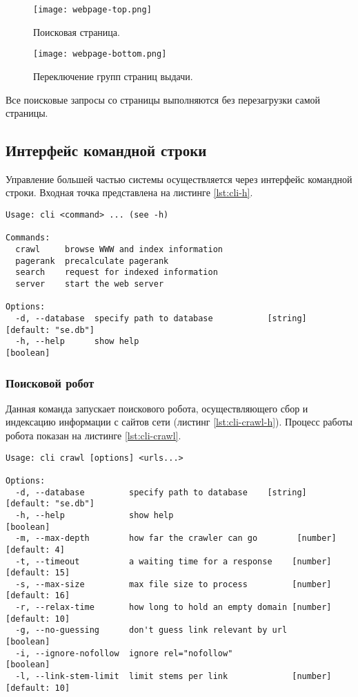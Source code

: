 \begin{figure}[h]
  \centering
  \texttt{[image: webpage-top.png]}
  \caption{Поисковая страница.}
  \label{fig:webpage-top}
\end{figure}

\begin{figure}[h]
  \centering
  \texttt{[image: webpage-bottom.png]}
  \caption{Переключение групп страниц выдачи.}
  \label{fig:webpage-bottom}
\end{figure}

Все поисковые запросы со страницы выполняются без перезагрузки самой страницы.


\subsection*{Интерфейс командной строки}
Управление большей частью системы осуществляется через интерфейс командной строки. Входная точка представлена на листинге \ref{lst:cli-h}.
\begin{lstlisting}[caption=Интерфейс командной строки., label=lst:cli-h]
Usage: cli <command> ... (see -h)

Commands:
  crawl     browse WWW and index information
  pagerank  precalculate pagerank
  search    request for indexed information
  server    start the web server

Options:
  -d, --database  specify path to database           [string] [default: "se.db"]
  -h, --help      show help                                            [boolean]
\end{lstlisting}


\subsubsection*{Поисковой робот}
Данная команда запускает поискового робота, осуществляющего сбор и индексацию информации с сайтов сети (листинг \ref{lst:cli-crawl-h}). Процесс работы робота показан на листинге \ref{lst:cli-crawl}.
\begin{lstlisting}[caption=Интерфейс командной строки: поисковой робот., label=lst:cli-crawl-h]
Usage: cli crawl [options] <urls...>

Options:
  -d, --database         specify path to database    [string] [default: "se.db"]
  -h, --help             show help                                     [boolean]
  -m, --max-depth        how far the crawler can go        [number] [default: 4]
  -t, --timeout          a waiting time for a response    [number] [default: 15]
  -s, --max-size         max file size to process         [number] [default: 16]
  -r, --relax-time       how long to hold an empty domain [number] [default: 10]
  -g, --no-guessing      don't guess link relevant by url              [boolean]
  -i, --ignore-nofollow  ignore rel="nofollow"                         [boolean]
  -l, --link-stem-limit  limit stems per link             [number] [default: 10]
\end{lstlisting}

